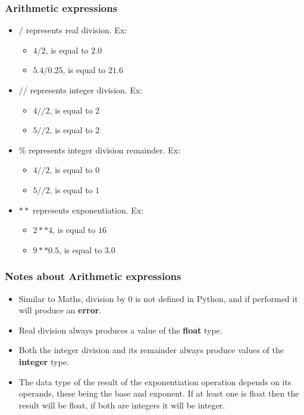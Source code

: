 \documentclass{beamer}
\begin{document}
\begin{frame}
    \frametitle{Arithmetic expressions}
        \begin{itemize}
            \item $/$ represents real division. Ex:
            \begin{itemize}
                \item $4/2$, is equal to $2.0$
                \item $5.4/0.25$, is equal to $21.6$
            \end{itemize}
            \item $//$ represents integer division. Ex:
            \begin{itemize}
                \item $4//2$, is equal to $2$
                \item $5//2$, is equal to $2$
            \end{itemize}
            \item $\%$ represents integer division remainder. Ex:
            \begin{itemize}
                \item $4//2$, is equal to $0$
                \item $5//2$, is equal to $1$
            \end{itemize}
            \item $**$ represents exponentiation. Ex:
            \begin{itemize}
                \item $2**4$, is equal to $16$
                \item $9**0.5$, is equal to $3.0$
            \end{itemize}
        \end{itemize}
\end{frame}

\begin{frame}
    \frametitle{Notes about Arithmetic expressions}
        \begin{itemize}
            \item Similar to Maths, division by $0$ is not defined in Python,
            and if performed it will produce an \textbf{error}.
            \item Real division always produces a value of the \textbf{float} type.
            \item Both the integer division and its remainder always produce
            values of the \textbf{integer} type.
            \item The data type of the result of the exponentiation operation
            depends on its operands, these being the base and exponent. If at
            least one is float then the result will be float, if both are integers
            it will be integer.
        \end{itemize}
\end{frame}
\end{document}

